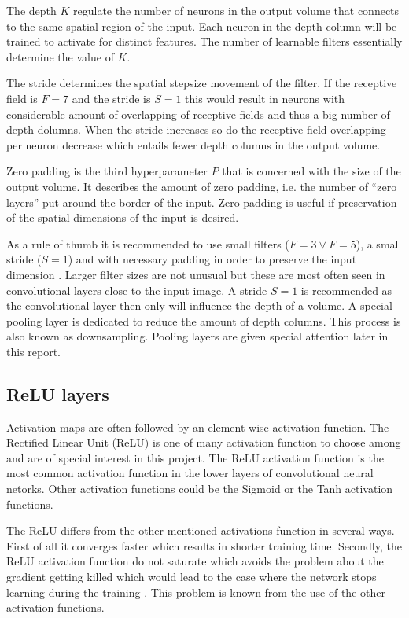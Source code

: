 The depth $K$ regulate the number of neurons in the output volume that connects to the same spatial region of the input. Each neuron in the depth column will be trained to activate for distinct features. The number of learnable filters essentially determine the value of $K$.

The stride determines the spatial stepsize movement of the filter. If the receptive field is $F = 7$ and the stride is $S = 1$ this would result in neurons with considerable amount of overlapping of receptive fields and thus a big number of depth dolumns. When the stride increases so do the receptive field overlapping per neuron decrease which entails fewer depth columns in the output volume. 

Zero padding is the third hyperparameter $P$ that is concerned with the size of the output volume. It describes the amount of zero padding, i.e. the number of ``zero layers'' put around the border of the input. Zero padding is useful if preservation of the spatial dimensions of the input is desired. 

As a rule of thumb it is recommended to use small filters ($F=3 \vee F=5$), a small stride ($S=1$) and with necessary padding in order to preserve the input dimension \cite{cs231n}. Larger filter sizes are not unusual but these are most often seen in convolutional layers close to the input image. A stride $S=1$ is recommended as the convolutional layer then only will influence the depth of a volume. A special pooling layer is dedicated to reduce the amount of depth columns. This process is also known as downsampling. Pooling layers are given special attention later in this report.

\subsection{ReLU layers} %
\label{sub:relu_layers}

Activation maps are often followed by an element-wise activation function. The Rectified Linear Unit (ReLU) is one of many activation function to choose among and are of special interest in this project. The ReLU activation function is the most common activation function in the lower layers of convolutional neural netorks. Other activation functions could be the Sigmoid or the Tanh activation functions.

The ReLU differs from the other mentioned activations function in several ways. First of all it converges faster which results in shorter training time. Secondly, the ReLU activation function do not saturate which avoids the problem about the gradient getting killed which would lead to the case where the network stops learning during the training \cite{cs231n}. This problem is known from the use of the other activation functions. 

